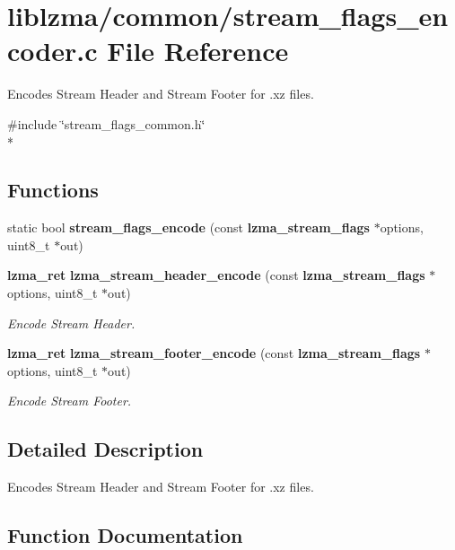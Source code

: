 \section{liblzma/common/stream\-\_\-flags\-\_\-encoder.c File Reference}
\label{stream__flags__encoder_8c}


Encodes Stream Header and Stream Footer for .xz files.  


{\ttfamily \#include \char`\"{}stream\-\_\-flags\-\_\-common.\-h\char`\"{}}\\*
\subsection*{Functions}
\begin{DoxyCompactItemize}
\item 
static bool {\bfseries stream\-\_\-flags\-\_\-encode} (const {\bf lzma\-\_\-stream\-\_\-flags} $\ast$options, uint8\-\_\-t $\ast$out)\label{stream__flags__encoder_8c_accd4a19742fc30c8a53f79b4ab6d120a}

\item 
{\bf lzma\-\_\-ret} {\bf lzma\-\_\-stream\-\_\-header\-\_\-encode} (const {\bf lzma\-\_\-stream\-\_\-flags} $\ast$options, uint8\-\_\-t $\ast$out)
\begin{DoxyCompactList}\small\item\em Encode Stream Header. \end{DoxyCompactList}\item 
{\bf lzma\-\_\-ret} {\bf lzma\-\_\-stream\-\_\-footer\-\_\-encode} (const {\bf lzma\-\_\-stream\-\_\-flags} $\ast$options, uint8\-\_\-t $\ast$out)
\begin{DoxyCompactList}\small\item\em Encode Stream Footer. \end{DoxyCompactList}\end{DoxyCompactItemize}


\subsection{Detailed Description}
Encodes Stream Header and Stream Footer for .xz files. 

\subsection{Function Documentation}
